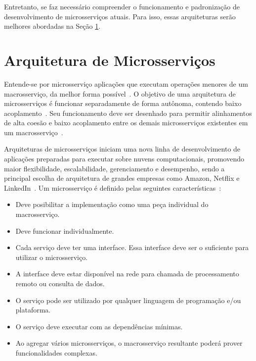 Entretanto, se faz necessário compreender o funcionamento e padronização de desenvolvimento de microsserviços atuais.
%
Para isso, essas arquiteturas serão melhores abordadas na Seção \ref{sec:microsservicos}.



\section{Arquitetura de Microsserviços}
\label{sec:microsservicos}



Entende-se por microsserviço aplicações que executam operações menores de um macrosserviço, da melhor forma possível~\cite{stephenclarkewillson2017, Newman2015Feb}.
%
O objetivo de uma arquitetura de microsserviços é funcionar separadamente de forma autônoma, contendo baixo acoplamento~\cite{Newman2015Feb}.
%
Seu funcionamento deve ser desenhado para permitir alinhamentos de alta coesão e baixo acoplamento entre os demais microsserviços existentes em um macrosserviço~\cite{8169955}.



Arquiteturas de microsserviços iniciam uma nova linha de desenvolvimento de aplicações preparadas para executar sobre nuvens computacionais, promovendo maior flexibilidade, escalabilidade, gerenciamento e desempenho, sendo a principal escolha de arquitetura de grandes empresas como Amazon, Netflix e LinkedIn~\cite{7830692,7515686}.
%
Um microsserviço é definido pelas seguintes características~\cite{8169955}:



\begin{itemize}
  \item Deve posibilitar a implementação como uma peça individual do macrosserviço.
  \item Deve funcionar individualmente.
  \item Cada serviço deve ter uma interface. Essa interface deve ser o suficiente para utilizar o microsserviço.
  \item A interface deve estar disponível na rede para chamada de processamento remoto ou consulta de dados.
  \item O serviço pode ser utilizado por qualquer linguagem de programação e/ou plataforma.
  \item O serviço deve executar com as dependências mínimas.
  \item Ao agregar vários microsserviços, o macrosserviço resultante poderá prover funcionalidades complexas.
\end{itemize}


